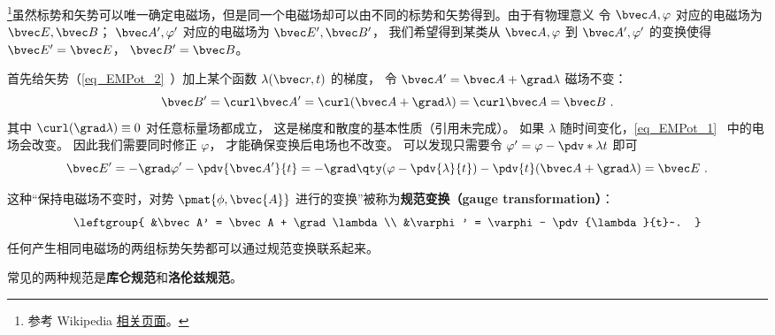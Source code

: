 
\begin{issues}
\issueDraft
\end{issues}


\footnote{参考 Wikipedia \href{https://en.wikipedia.org/wiki/Gauge_fixing}{相关页面}。}虽然标势和矢势可以唯一确定电磁场，但是同一个电磁场却可以由不同的标势和矢势得到。由于有物理意义 令 $\bvec A, \varphi$ 对应的电磁场为 $\bvec E, \bvec B$； $\bvec A', \varphi'$ 对应的电磁场为 $\bvec E', \bvec B'$， 我们希望得到某类从 $\bvec A, \varphi$ 到 $\bvec A', \varphi'$ 的变换使得 $\bvec E' = \bvec E$， $\bvec B' = \bvec B$。

首先给矢势（\autoref{eq_EMPot_2}~）加上某个函数 $\lambda(\bvec r, t)$ 的梯度， 令 $\bvec A' = \bvec A + \grad\lambda$ 磁场不变：
\begin{equation}
\bvec B' = \curl \bvec A' = \curl (\bvec A + \grad \lambda) = \curl \bvec A = \bvec B~.
\end{equation}
其中 $\curl(\grad \lambda) \equiv 0$ 对任意标量场都成立， 这是梯度和散度的基本性质（引用未完成）。 如果 $\lambda$ 随时间变化，\autoref{eq_EMPot_1}~ 中的电场会改变。 因此我们需要同时修正 $\varphi$， 才能确保变换后电场也不改变。 可以发现只需要令 $\varphi' = \varphi - \pdv*{\lambda}{t}$ 即可
\begin{equation}
\bvec E' = -\grad \varphi' - \pdv{\bvec A'}{t} = -\grad \qty(\varphi - \pdv{\lambda}{t}) - \pdv{t} (\bvec A + \grad \lambda) = \bvec E~.
\end{equation}


这种“保持电磁场不变时，对势 $\pmat{\phi, \bvec{A}}$ 进行的变换”被称为\textbf{规范变换（gauge transformation）}：
\begin{equation}\label{eq_Gauge_3}
\leftgroup{
&\bvec A' = \bvec A + \grad \lambda\\
&\varphi' = \varphi - \pdv{\lambda}{t}~.
}\end{equation}
任何产生相同电磁场的两组标势矢势都可以通过规范变换联系起来。

常见的两种规范是\textbf{库仑规范}和\textbf{洛伦兹规范}。
